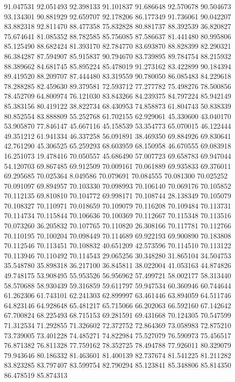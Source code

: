 91.047531
92.051493
92.398133
91.101837
91.686648
92.570678
90.504673
93.134301
90.881929
92.659707
92.178206
86.177349
91.736061
90.042207
83.882318
92.811470
88.477358
75.832828
80.881737
88.392539
36.820827
75.674641
81.085352
88.782585
85.756085
87.586637
81.441480
80.995806
85.125490
88.682424
81.393170
82.784770
83.693870
88.828399
82.290321
86.384287
87.594907
85.915837
90.794670
83.739895
89.784754
88.215932
88.389662
84.681745
85.895224
85.478019
91.273162
83.422899
90.184394
89.419520
88.209707
87.444480
83.319559
90.780050
86.085483
84.229618
78.288285
82.459630
89.379581
72.593712
77.277782
75.498276
78.500856
78.452709
64.800974
76.121030
83.843266
84.239375
84.797224
85.942149
85.383156
80.419122
38.822734
68.430953
74.858873
61.804743
50.838339
80.852554
83.888809
55.252768
61.702155
62.929061
45.330600
43.040170
53.905870
77.846147
45.667116
45.158539
53.354773
65.070015
46.122444
49.351212
61.941334
46.337258
56.091891
38.469350
69.884926
69.830641
42.761290
45.306525
65.259293
68.603959
68.150958
46.670555
69.083918
16.251073
19.478416
70.050557
45.686490
57.007723
69.658783
69.947044
54.120703
69.867485
69.912509
70.009161
70.061889
69.935833
69.376011
69.295685
70.025364
8.049586
70.079691
70.084555
70.081300
70.025252
70.091097
69.894957
70.103330
70.098993
70.106140
70.069176
70.105852
70.112135
69.810810
70.104772
69.998171
70.108744
28.138349
70.105079
70.108327
70.110971
70.018659
70.109079
70.116208
70.109484
70.113731
70.114734
70.115844
70.106636
70.100369
70.112667
70.115348
70.113516
70.073260
36.205832
70.107765
70.110820
26.308166
70.117781
70.112766
70.110195
70.100204
70.098449
70.114689
69.922193
69.900890
70.183808
70.112546
70.113451
70.108832
40.651209
42.573596
70.114510
70.113122
70.113946
70.110492
70.114543
29.065256
30.348280
31.865104
34.504753
35.548780
35.898318
36.217100
36.845811
38.022004
41.053163
44.874826
49.748175
53.908495
55.953526
56.956962
57.499721
58.002177
58.313440
58.570688
58.930439
59.316859
59.611797
59.947534
60.360946
60.744644
61.262306
61.743101
62.241303
62.899997
63.461446
63.894059
64.511746
64.823146
64.928648
65.481217
65.715066
66.202063
66.592160
67.142642
67.700824
68.225493
68.715153
69.281591
69.431668
70.124305
70.547599
71.312534
71.292855
71.326602
72.372752
72.864369
73.058983
72.875210
73.739005
73.401228
74.485271
74.822984
75.527079
76.590973
75.456517
76.871382
76.811328
77.759162
78.352725
78.494788
77.926011
80.329079
79.943646
80.186332
81.463601
81.400139
82.737674
81.541225
81.211282
83.823285
83.797407
83.599754
82.790294
85.123841
85.348806
85.814350
86.478519
85.874313
